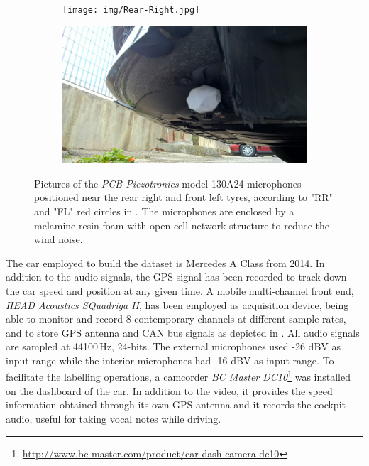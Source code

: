 \begin{figure}[t]
	\centering
	\begin{subfigure}[b]{0.48\textwidth}
		\texttt{[image: img/Rear-Right.jpg]}
	\end{subfigure}
	\hfil
	\begin{subfigure}[b]{0.48\textwidth}
		\includegraphics[width=\textwidth]{img/Front-Left.jpg}
	\end{subfigure}
	
	
	\caption[Microphones positioning]{Pictures of the \textit{PCB Piezotronics} model 130A24 microphones positioned near the rear right and front left tyres, according to "RR" and "FL" red circles in . The microphones are enclosed by a melamine resin foam with open cell network structure to reduce the wind noise.}
	\label{fig:car-rr-and-fl}
\end{figure}


The car employed to build the dataset is Mercedes A Class from 2014. In addition to the audio signals, the GPS signal has been recorded to track down the car speed and position at any given time. A mobile multi-channel front end, \textit{HEAD Acoustics SQuadriga II}, has been employed as acquisition device, being able to monitor and record 8 contemporary channels at different sample rates, and to store GPS antenna and CAN bus signals as depicted in .
All audio signals are sampled at 44100\,Hz, 24-bits. The external microphones used -26 dBV as input range while the interior microphones had -16 dBV as input range.
To facilitate the labelling operations, a camcorder \textit{BC Master DC10}\footnote{\url{http://www.bc-master.com/product/car-dash-camera-dc10}} was installed on the dashboard of the car. In addition to the video, it provides the speed information obtained through its own GPS antenna and it records the cockpit audio, useful for taking vocal notes while driving.

